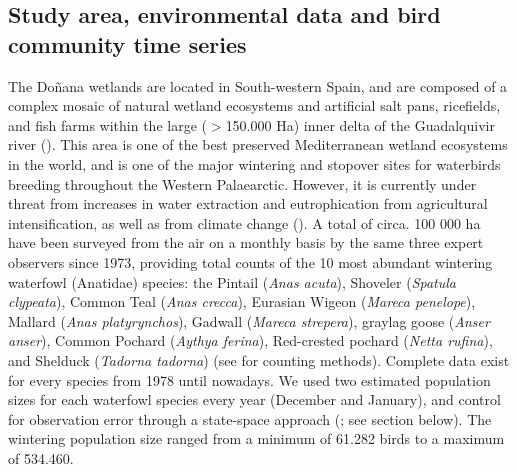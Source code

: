 \documentclass[12pt]{article}
\begin{document}
\subsection*{Study area, environmental data and bird community time series}
\label{subsec:StudyArea}

The Doñana wetlands are located in South-western Spain, and are composed of a complex mosaic of natural wetland ecosystems and artificial salt pans, ricefields, and fish farms within the large ($ > $150.000 Ha) inner delta of the Guadalquivir river (\cite{Rendon2008,Almaraz2012,Green2018}). This area is one of the best preserved Mediterranean wetland ecosystems in the world, and is one of the major wintering and stopover sites for waterbirds breeding throughout the Western Palaearctic. However, it is currently under threat from increases in water extraction and eutrophication from agricultural intensification, as well as from climate change  (\cite{Marin2006,Scheffer2015a,Green2017a,Camacho2022}). A total of circa. 100 000 ha have been surveyed from the air on a monthly basis by the same three expert observers since 1973, providing total counts of the 10 most abundant wintering waterfowl (Anatidae) species: the Pintail (\textit{Anas acuta}), Shoveler (\textit{Spatula clypeata}), Common Teal (\textit{Anas crecca}), Eurasian Wigeon (\textit{Mareca penelope}), Mallard (\textit{Anas platyrynchos}), Gadwall (\textit{Mareca strepera}), graylag goose (\textit{Anser anser}), Common Pochard (\textit{Aythya ferina}), Red-crested pochard (\textit{Netta rufina}), and Shelduck (\textit{Tadorna tadorna}) (see \cite{Rendon2008} for counting methods). Complete data exist for every species from 1978 until nowadays. We used two estimated population sizes for each waterfowl species every year (December and January), and control for observation error through a state-space approach (\cite{Almaraz2012}; see  section below). The wintering population size ranged from a minimum of 61.282 birds to a maximum of 534.460.\\
\end{document}

